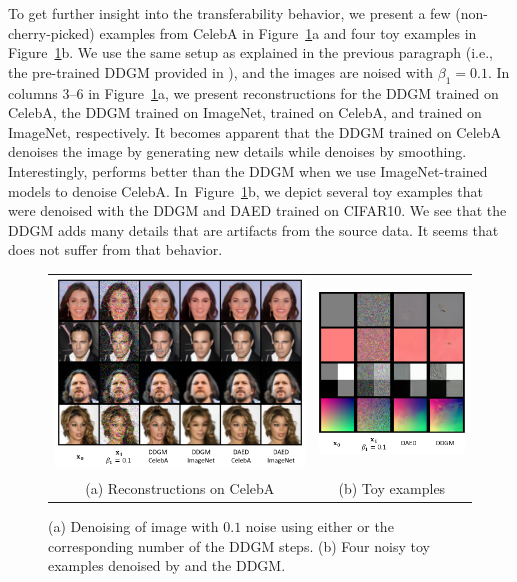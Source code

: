 To get further insight into the transferability behavior, we present a few (non-cherry-picked) examples from CelebA in Figure~\ref{fig:transferability}a and four toy examples in Figure~\ref{fig:transferability}b. We use the same setup as explained in the previous paragraph (i.e., the pre-trained DDGM provided in \citet{nichol2021improved}), and the images are noised with $\beta_1=0.1$. In columns 3--6 in Figure~\ref{fig:transferability}a, we present reconstructions for the DDGM trained on CelebA, the DDGM trained on ImageNet, \ours{} trained on CelebA, and \ours{} trained on ImageNet, respectively. It becomes apparent that the DDGM trained on CelebA denoises the image by generating new details while \ours{} denoises by smoothing. 
Interestingly, \ours{} performs better than the DDGM when we use ImageNet-trained models to denoise CelebA.
In~Figure~\ref{fig:transferability}b, we depict several toy examples that were denoised with the DDGM and DAED trained on CIFAR10. We see that the DDGM adds many details that are artifacts from the source data. It seems that \ours{} does not suffer from that behavior.

\begin{figure}[t]
	\centering
	\begin{tabular}{cc}
	   \includegraphics[width=0.56\linewidth, valign=c]{pics/4_daed/experiments/portability.png} & \includegraphics[width=0.38\linewidth, valign=c]{pics/4_daed/experiments/toy_example.png} \\
	    (a) Reconstructions on CelebA & (b) Toy examples
	\end{tabular}
	\caption{(a) Denoising of image with $0.1$ noise using either \ours{} or the corresponding number of the DDGM steps. (b) Four noisy toy examples denoised by \ours{} and the DDGM.}
	\label{fig:transferability}
\end{figure}
